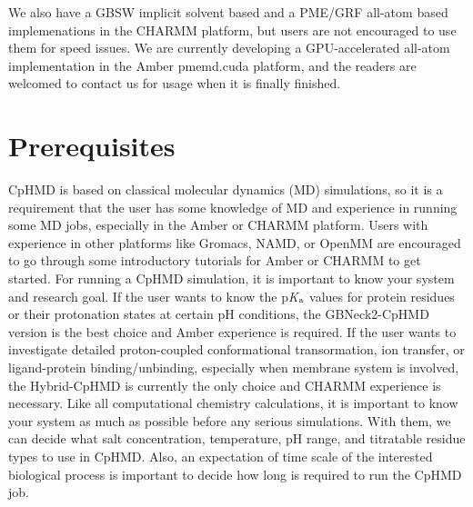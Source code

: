 \documentclass[9pt,tutorial]{livecoms}
\newcommand{\pka}{p\textit{K}$_{\rm a}$}
\begin{document}


We also have a GBSW implicit solvent based and a PME/GRF all-atom based implemenations in the CHARMM platform, but users are not encouraged to use them for speed issues. We are currently developing a GPU-accelerated all-atom implementation in the Amber pmemd.cuda platform, and the readers are welcomed to contact us for usage when it is finally finished.

\section{Prerequisites} %
CpHMD is based on classical molecular dynamics (MD) simulations, so it is a requirement that the user has some knowledge of MD and experience in running some MD jobs, especially in the Amber or CHARMM platform. Users with experience in other platforms like Gromacs, NAMD, or OpenMM are encouraged to go through some introductory tutorials for Amber or CHARMM to get started. For running a CpHMD simulation, it is important to know your system and research goal. If the user wants to know the {\pka} values for protein residues or their protonation states at certain pH conditions, the GBNeck2-CpHMD version is the best choice and Amber experience is required. If the user wants to investigate detailed proton-coupled conformational transormation, ion transfer, or ligand-protein binding/unbinding, especially when membrane system is involved, the Hybrid-CpHMD is currently the only choice and CHARMM experience is necessary. Like all computational chemistry calculations, it is important to know your system as much as possible before any serious simulations. With them, we can decide what salt concentration, temperature, pH range, and titratable residue types to use in CpHMD. Also, an expectation of time scale of the interested biological process is important to decide how long is required to run the CpHMD job.
\end{document}
